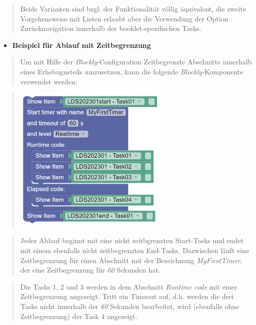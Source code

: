 \documentclass[
  letterpaper,
  DIV=11]{scrreprt}
\providecommand{\tightlist}{%
  \setlength{\itemsep}{0pt}\setlength{\parskip}{0pt}}\usepackage{longtable,booktabs,array}
\begin{document}
\begin{tcolorbox}
\begin{quote}
Beide Varianten sind bzgl. der Funktionalität völlig äquivalent, die
zweite Vorgehensweise mit Listen erlaubt aber die Verwendung der Option
Zurücknavigation innerhalb der booklet-spezifischen Tasks.
\end{quote}

\begin{itemize}
\tightlist
\item
  \textbf{Beispiel für Ablauf mit Zeitbegrenzung}
\end{itemize}

\begin{quote}
Um mit Hilfe der \emph{Blockly}-Configuration Zeitbegrenzte Abschnitte
innerhalb eines Erhebugnsteils umzusetzen, kann die folgende
\emph{Blockly}-Komponente verwendet werden:
\end{quote}

\begin{quote}
\includegraphics[width=2.91667in,height=\textheight]{img/screenshot-show-items-lds2003-01-example-simple-timer-ENG.png}
\end{quote}

\begin{quote}
Jeder Ablauf beginnt mit eine nicht zeitbgrenzten Start-Tasks und endet
mit einem ebenfalls nicht zeitbegrenzten End-Tasks. Dazwischen läuft
eine Zeitbegrenzung für einen Abschnitt mit der Bezeichnung
\emph{MyFirstTimer}, der eine Zeitbegrenzung für \emph{60} Sekunden hat.
\end{quote}

\begin{quote}
Die Tasks 1, 2 und 3 werden in dem Abschnitt \emph{Runtime code} mit
einer Zeitbegrenzung angezeigt. Tritt ein Timeout auf, d.h. werden die
drei Tasks nicht innerhalb der \emph{60} Sekunden bearbeitet, wird
(ebenfalls ohne Zeitbegrenzung) der Task 4 angezeigt.
\end{quote}


\end{tcolorbox}
\end{document}

